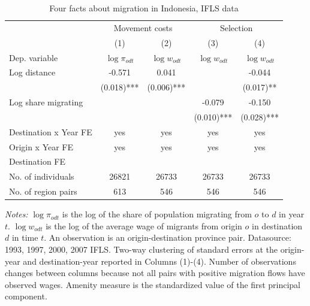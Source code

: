 \begin{table}[hbpt] \begin{center}\begin{threeparttable}\caption{ {Four facts about migration in Indonesia, IFLS data     }} \begin{tabular}{l*{4}c} \toprule
&\multicolumn{2}{c}{Movement costs}&\multicolumn{2}{c}{Selection}\\
&(1)&(2)&(3)&(4)\\
Dep. variable&$\log \pi_{odt}$&$\log w_{odt}$ &$\log w_{odt}$ &$\log w_{odt}$ \\
\midrule
Log distance&-0.571&0.041&&-0.044\\
&(0.018)***&(0.006)***&&(0.017)**\\
Log share migrating&&&-0.079&-0.150\\
&&&(0.010)***&(0.028)***\\
\midrule
Destination x Year FE&yes&yes&yes&yes\\
Origin x Year FE&yes&yes&yes&yes\\
Destination FE&&&&\\
No. of individuals&26821&26733&26733&26733\\
No. of region pairs&613&546&546&546\\
\bottomrule \end{tabular} \label{Four facts about migration in Indonesia, IFLS data     } \begin{tablenotes} \item {\footnotesize \emph{Notes: } $\log \pi_{odt}$ is the log of the share of population migrating from $ o $ to $ d $ in year $ t $. $\log w_{odt}$ is the log of the average wage of migrants from origin $ o $ in destination $ d $ in time $ t $. An observation is an origin-destination province pair. Datasource: 1993, 1997, 2000, 2007 IFLS. Two-way clustering of standard errors at the origin-year and destination-year reported in Columns (1)-(4). Number of observations changes between columns because not all pairs with positive migration flows have observed wages. Amenity measure is the standardized value of the first principal component. } \end{tablenotes} \end{threeparttable} \end{center} \end{table}
